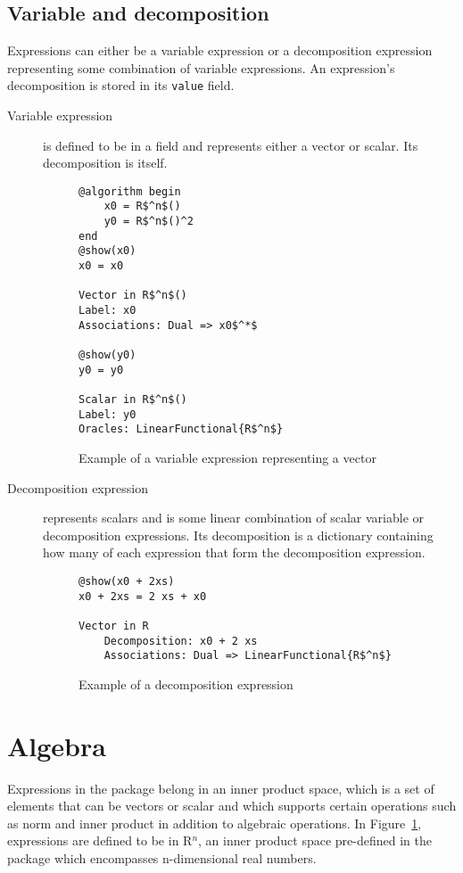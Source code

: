 \subsection*{Variable and decomposition}
Expressions can either be a variable expression or a decomposition expression representing some combination of variable expressions. An expression's decomposition is stored in its \texttt{value} field.
\begin{description}
	\item[Variable expression] is defined to be in a field and represents either a vector or scalar. Its decomposition is itself.
\begin{figure}[h]
		\begin{lstlisting}[mathescape]
@algorithm begin
	x0 = R$^n$()
	y0 = R$^n$()^2
end
@show(x0)
x0 = x0

Vector in R$^n$()
Label: x0
Associations: Dual => x0$^*$

@show(y0)
y0 = y0

Scalar in R$^n$()
Label: y0
Oracles: LinearFunctional{R$^n$}
		\end{lstlisting}
	
	\caption{Example of a variable expression representing a vector}
	\label{ex_variable}
\end{figure}
	\item[Decomposition expression] represents scalars and is some linear combination of scalar variable or decomposition expressions. Its decomposition is a dictionary containing how many of each expression that form the decomposition expression.

\begin{figure}[h]
		\begin{lstlisting}[mathescape]
@show(x0 + 2xs)
x0 + 2xs = 2 xs + x0

Vector in R
	Decomposition: x0 + 2 xs
	Associations: Dual => LinearFunctional{R$^n$}
		\end{lstlisting}
	\caption{Example of a decomposition expression}
	\label{ex_decomposition}
\end{figure}
\end{description}

\section{Algebra}
Expressions in the package belong in an inner product space, which is a set of elements that can be vectors or scalar and which supports certain operations such as norm and inner product in addition to algebraic operations. In Figure~\ref{ex_variable}, expressions are defined to be in R$^n$, an inner product space pre-defined in the package which encompasses n-dimensional real numbers.

